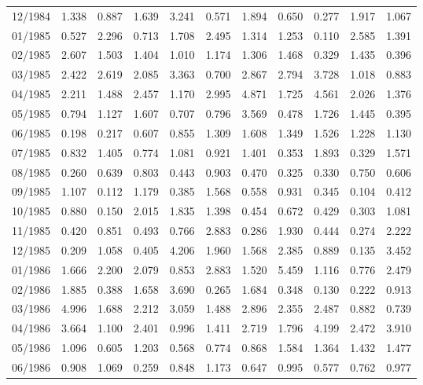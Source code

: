 \begin{tabular}{lrrrrrrrrrr}
12/1984 &  1.338 &  0.887 &  1.639 &  3.241 &  0.571 &  1.894 &  0.650 &  0.277 &  1.917 &  1.067 \\
01/1985 &  0.527 &  2.296 &  0.713 &  1.708 &  2.495 &  1.314 &  1.253 &  0.110 &  2.585 &  1.391 \\
02/1985 &  2.607 &  1.503 &  1.404 &  1.010 &  1.174 &  1.306 &  1.468 &  0.329 &  1.435 &  0.396 \\
03/1985 &  2.422 &  2.619 &  2.085 &  3.363 &  0.700 &  2.867 &  2.794 &  3.728 &  1.018 &  0.883 \\
04/1985 &  2.211 &  1.488 &  2.457 &  1.170 &  2.995 &  4.871 &  1.725 &  4.561 &  2.026 &  1.376 \\
05/1985 &  0.794 &  1.127 &  1.607 &  0.707 &  0.796 &  3.569 &  0.478 &  1.726 &  1.445 &  0.395 \\
06/1985 &  0.198 &  0.217 &  0.607 &  0.855 &  1.309 &  1.608 &  1.349 &  1.526 &  1.228 &  1.130 \\
07/1985 &  0.832 &  1.405 &  0.774 &  1.081 &  0.921 &  1.401 &  0.353 &  1.893 &  0.329 &  1.571 \\
08/1985 &  0.260 &  0.639 &  0.803 &  0.443 &  0.903 &  0.470 &  0.325 &  0.330 &  0.750 &  0.606 \\
09/1985 &  1.107 &  0.112 &  1.179 &  0.385 &  1.568 &  0.558 &  0.931 &  0.345 &  0.104 &  0.412 \\
10/1985 &  0.880 &  0.150 &  2.015 &  1.835 &  1.398 &  0.454 &  0.672 &  0.429 &  0.303 &  1.081 \\
11/1985 &  0.420 &  0.851 &  0.493 &  0.766 &  2.883 &  0.286 &  1.930 &  0.444 &  0.274 &  2.222 \\
12/1985 &  0.209 &  1.058 &  0.405 &  4.206 &  1.960 &  1.568 &  2.385 &  0.889 &  0.135 &  3.452 \\
01/1986 &  1.666 &  2.200 &  2.079 &  0.853 &  2.883 &  1.520 &  5.459 &  1.116 &  0.776 &  2.479 \\
02/1986 &  1.885 &  0.388 &  1.658 &  3.690 &  0.265 &  1.684 &  0.348 &  0.130 &  0.222 &  0.913 \\
03/1986 &  4.996 &  1.688 &  2.212 &  3.059 &  1.488 &  2.896 &  2.355 &  2.487 &  0.882 &  0.739 \\
04/1986 &  3.664 &  1.100 &  2.401 &  0.996 &  1.411 &  2.719 &  1.796 &  4.199 &  2.472 &  3.910 \\
05/1986 &  1.096 &  0.605 &  1.203 &  0.568 &  0.774 &  0.868 &  1.584 &  1.364 &  1.432 &  1.477 \\
06/1986 &  0.908 &  1.069 &  0.259 &  0.848 &  1.173 &  0.647 &  0.995 &  0.577 &  0.762 &  0.977 \\

\end{tabular}
